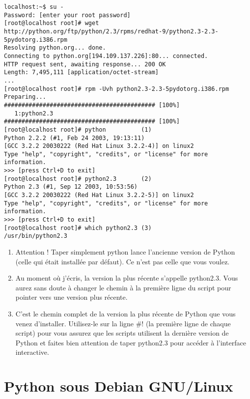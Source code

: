 \begin{example}
\begin{lstlisting}[style=none]
localhost:~$ su -
Password: [enter your root password]
[root@localhost root]# wget http://python.org/ftp/python/2.3/rpms/redhat-9/python2.3-2.3-5pydotorg.i386.rpm
Resolving python.org... done.
Connecting to python.org[194.109.137.226]:80... connected.
HTTP request sent, awaiting response... 200 OK
Length: 7,495,111 [application/octet-stream]
...
[root@localhost root]# rpm -Uvh python2.3-2.3-5pydotorg.i386.rpm
Preparing...                ########################################### [100%]
   1:python2.3              ########################################### [100%]
[root@localhost root]# python          (1)
Python 2.2.2 (#1, Feb 24 2003, 19:13:11)
[GCC 3.2.2 20030222 (Red Hat Linux 3.2.2-4)] on linux2
Type "help", "copyright", "credits", or "license" for more information.
>>> [press Ctrl+D to exit]
[root@localhost root]# python2.3       (2)
Python 2.3 (#1, Sep 12 2003, 10:53:56)
[GCC 3.2.2 20030222 (Red Hat Linux 3.2.2-5)] on linux2
Type "help", "copyright", "credits", or "license" for more information.
>>> [press Ctrl+D to exit]
[root@localhost root]# which python2.3 (3)
/usr/bin/python2.3
\end{lstlisting}
\end{example}

\begin{enumerate}
    \item{Attention ! Taper simplement python lance l'ancienne version de Python (celle qui était installée par défaut). Ce n'est pas celle que vous voulez.}
    \item{Au moment où j'écris, la version la plus récente s'appelle python2.3. Vous aurez sans doute à changer le chemin à la première ligne du script pour pointer vers une version plus récente.}
    \item{C'est le chemin complet de la version la plus récente de Python que vous venez d'installer. Utilisez-le sur la ligne \#! (la première ligne de chaque script)  pour vous assurez que les scripts utilisent la dernière version de Python et faites bien attention de taper python2.3 pour accéder à l'interface interactive.}
\end{enumerate}

\section{Python sous Debian GNU/Linux}\label{Python sous Debian GNU/Linux}

